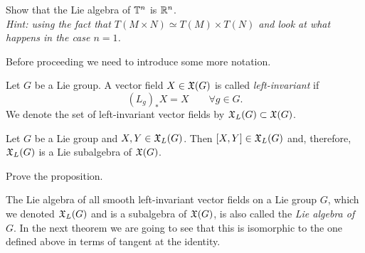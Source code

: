 \begin{exercise}
  Show that the Lie algebra of $\mathbb{T}^n$ is $\mathbb{R}^n$.\\
  \textit{\small Hint: using the fact that $T(M\times N) \simeq T(M)\times T(N)$ and look at what happens in the case $n=1$.}
\end{exercise}

Before proceeding we need to introduce some more notation.

\begin{definition}
  Let $G$ be a Lie group.
  A vector field $X\in\mathfrak{X}(G)$ is called \emph{left-invariant} if
  \begin{equation}
    (L_g)_*X = X \qquad \forall g\in G.
  \end{equation}
  We denote the set of left-invariant vector fields by $\mathfrak{X}_L(G)\subset \mathfrak{X}(G)$.
\end{definition}



\begin{proposition}
  Let $G$ be a Lie group and $X,Y\in\mathfrak{X}_L(G)$.
  Then $[X,Y]\in\mathfrak{X}_L(G)$ and, therefore, $\mathfrak{X}_L(G)$ is a Lie subalgebra of $\mathfrak{X}(G)$.
\end{proposition}
\begin{exercise}
  Prove the proposition.
\end{exercise}

\begin{remark}
  The Lie algebra of all smooth left-invariant vector fields on a Lie group $G$, which we denoted $\mathfrak{X}_L(G)$ and is a subalgebra of $\mathfrak{X}(G)$, is also called the \emph{Lie algebra of $G$}.
  In the next theorem we are going to see that this is isomorphic to the one defined above in terms of tangent at the identity.
\end{remark}

